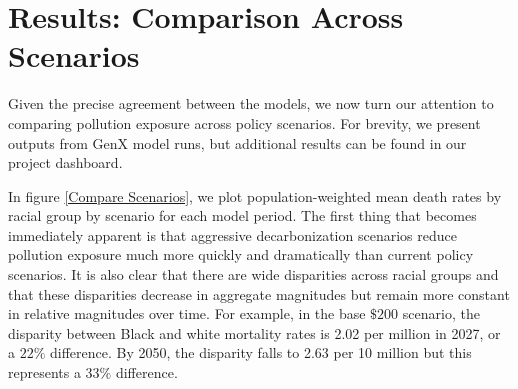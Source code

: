 \documentclass[a4paper]{article}
\theoremstyle{definition}
\theoremstyle{plain}
\begin{document}
\section{Results: Comparison Across Scenarios}

Given the precise agreement between the models, we now turn our attention to comparing pollution exposure across policy scenarios.  For brevity, we present outputs from GenX model runs, but additional results can be found in our project dashboard.  

In figure \ref{Compare Scenarios}, we plot population-weighted mean death rates by racial group by scenario for each model period.  The first thing that becomes immediately apparent is that aggressive decarbonization scenarios reduce pollution exposure much more quickly and dramatically than current policy scenarios.  It is also clear that there are wide disparities across racial groups and that these disparities decrease in aggregate magnitudes but remain more constant in relative magnitudes over time.  For example, in the base $\$200$ scenario, the disparity between Black and white mortality rates is 2.02 per million in 2027, or a $22\%$ difference.  By 2050, the disparity falls to 2.63 per 10 million but this represents a 33$\%$ difference.
\end{document}
